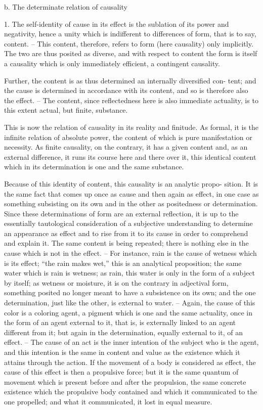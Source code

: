 b. The determinate relation of causality

1. The self-identity of cause in its effect is the sublation of its power and
negativity, hence a unity which is indifferent to differences of form, that
is to say, content. – This content, therefore, refers to form (here causality)
only implicitly. The two are thus posited as diverse, and with respect to
content the form is itself a causality which is only immediately efficient, a
contingent causality.

Further, the content is as thus determined an internally diversified con-
tent; and the cause is determined in accordance with its content, and so
is therefore also the effect. – The content, since reflectedness here is also
immediate actuality, is to this extent actual, but finite, substance.

This is now the relation of causality in its reality and finitude. As formal,
it is the infinite relation of absolute power, the content of which is pure
manifestation or necessity. As finite causality, on the contrary, it has a given
content and, as an external difference, it runs its course here and there over
it, this identical content which in its determination is one and the same
substance.

Because of this identity of content, this causality is an analytic propo-
sition. It is the same fact that comes up once as cause and then again as
effect, in one case as something subsisting on its own and in the other
as positedness or determination. Since these determinations of form are
an external reflection, it is up to the essentially tautological consideration
of a subjective understanding to determine an appearance as effect and to
rise from it to its cause in order to comprehend and explain it. The same
content is being repeated; there is nothing else in the cause which is not in
the effect. – For instance, rain is the cause of wetness which is its effect; “the
rain makes wet,” this is an analytical proposition; the same water which is
rain is wetness; as rain, this water is only in the form of a subject by itself;
as wetness or moisture, it is on the contrary in adjectival form, something
posited no longer meant to have a subsistence on its own; and the one
determination, just like the other, is external to water. – Again, the cause of
this color is a coloring agent, a pigment which is one and the same actuality,
once in the form of an agent external to it, that is, is externally linked to
an agent different from it; but again in the determination, equally external
to it, of an effect. – The cause of an act is the inner intention of the subject
who is the agent, and this intention is the same in content and value as the
existence which it attains through the action. If the movement of a body
is considered as effect, the cause of this effect is then a propulsive force;
but it is the same quantum of movement which is present before and after
the propulsion, the same concrete existence which the propulsive body
contained and which it communicated to the one propelled; and what it
communicated, it lost in equal measure.


